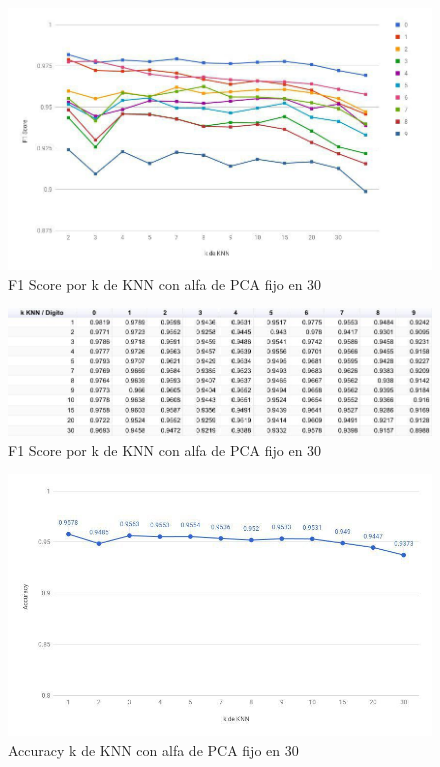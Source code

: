 \begin{figure}[H]
    \begin{center}
      \includegraphics[width=0.8\columnwidth]{imagenes/knn-f1-pca30.jpg}
      \caption{F1 Score por k de KNN con alfa de PCA fijo en 30}
    \end{center}
\end{figure}

\begin{figure}[H]
    \begin{center}
      \includegraphics[width=0.8\columnwidth]{imagenes/knn-f1-table-pca30.jpg}
      \caption{F1 Score por k de KNN con alfa de PCA fijo en 30}
    \end{center}
\end{figure}

\begin{figure}[H]
    \begin{center}
      \includegraphics[width=0.8\columnwidth]{imagenes/knn-accuracy-pca30.jpg}
      \caption{Accuracy k de KNN con alfa de PCA fijo en 30}
    \end{center}
\end{figure}